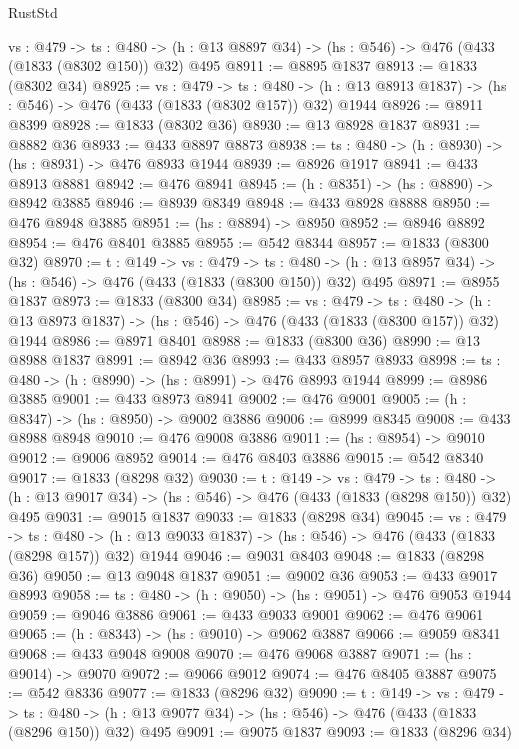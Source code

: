 \begin{lexlean}{RustStd}
\begin{coremodule}
  {vs : @479} ->
  {ts : @480} -> (h : @13 @8897 @34) -> (hs : @546) -> @476 (@433 (@1833 (@8302 @150)) @32) @495
@8911 := @8895 @1837
@8913 := @1833 (@8302 @34)
@8925 := {vs : @479} ->
  {ts : @480} -> (h : @13 @8913 @1837) -> (hs : @546) -> @476 (@433 (@1833 (@8302 @157)) @32) @1944
@8926 := @8911 @8399
@8928 := @1833 (@8302 @36)
@8930 := @13 @8928 @1837
@8931 := @8882 @36
@8933 := @433 @8897 @8873
@8938 := {ts : @480} -> (h : @8930) -> (hs : @8931) -> @476 @8933 @1944
@8939 := @8926 @1917
@8941 := @433 @8913 @8881
@8942 := @476 @8941
@8945 := (h : @8351) -> (hs : @8890) -> @8942 @3885
@8946 := @8939 @8349
@8948 := @433 @8928 @8888
@8950 := @476 @8948 @3885
@8951 := (hs : @8894) -> @8950
@8952 := @8946 @8892
@8954 := @476 @8401 @3885
@8955 := @542 @8344
@8957 := @1833 (@8300 @32)
@8970 := {t : @149} ->
  {vs : @479} ->
  {ts : @480} -> (h : @13 @8957 @34) -> (hs : @546) -> @476 (@433 (@1833 (@8300 @150)) @32) @495
@8971 := @8955 @1837
@8973 := @1833 (@8300 @34)
@8985 := {vs : @479} ->
  {ts : @480} -> (h : @13 @8973 @1837) -> (hs : @546) -> @476 (@433 (@1833 (@8300 @157)) @32) @1944
@8986 := @8971 @8401
@8988 := @1833 (@8300 @36)
@8990 := @13 @8988 @1837
@8991 := @8942 @36
@8993 := @433 @8957 @8933
@8998 := {ts : @480} -> (h : @8990) -> (hs : @8991) -> @476 @8993 @1944
@8999 := @8986 @3885
@9001 := @433 @8973 @8941
@9002 := @476 @9001
@9005 := (h : @8347) -> (hs : @8950) -> @9002 @3886
@9006 := @8999 @8345
@9008 := @433 @8988 @8948
@9010 := @476 @9008 @3886
@9011 := (hs : @8954) -> @9010
@9012 := @9006 @8952
@9014 := @476 @8403 @3886
@9015 := @542 @8340
@9017 := @1833 (@8298 @32)
@9030 := {t : @149} ->
  {vs : @479} ->
  {ts : @480} -> (h : @13 @9017 @34) -> (hs : @546) -> @476 (@433 (@1833 (@8298 @150)) @32) @495
@9031 := @9015 @1837
@9033 := @1833 (@8298 @34)
@9045 := {vs : @479} ->
  {ts : @480} -> (h : @13 @9033 @1837) -> (hs : @546) -> @476 (@433 (@1833 (@8298 @157)) @32) @1944
@9046 := @9031 @8403
@9048 := @1833 (@8298 @36)
@9050 := @13 @9048 @1837
@9051 := @9002 @36
@9053 := @433 @9017 @8993
@9058 := {ts : @480} -> (h : @9050) -> (hs : @9051) -> @476 @9053 @1944
@9059 := @9046 @3886
@9061 := @433 @9033 @9001
@9062 := @476 @9061
@9065 := (h : @8343) -> (hs : @9010) -> @9062 @3887
@9066 := @9059 @8341
@9068 := @433 @9048 @9008
@9070 := @476 @9068 @3887
@9071 := (hs : @9014) -> @9070
@9072 := @9066 @9012
@9074 := @476 @8405 @3887
@9075 := @542 @8336
@9077 := @1833 (@8296 @32)
@9090 := {t : @149} ->
  {vs : @479} ->
  {ts : @480} -> (h : @13 @9077 @34) -> (hs : @546) -> @476 (@433 (@1833 (@8296 @150)) @32) @495
@9091 := @9075 @1837
@9093 := @1833 (@8296 @34)

\end{coremodule}
\end{lexlean}
